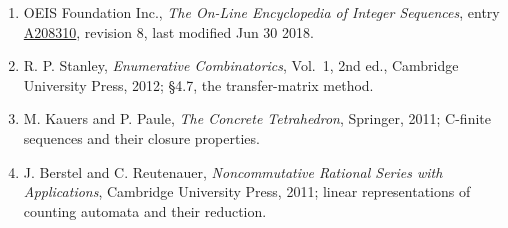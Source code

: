 \documentclass[11pt]{article}
\theoremstyle{definition}
\begin{document}
\begin{enumerate}

\item OEIS Foundation Inc., \emph{The On-Line Encyclopedia of Integer Sequences}, entry \href{https://oeis.org/A208310}{A208310}, revision 8, last modified Jun 30 2018.

\item R. P. Stanley, \emph{Enumerative Combinatorics}, Vol.~1, 2nd ed., Cambridge University Press, 2012; \S4.7, the transfer-matrix method.

\item M. Kauers and P. Paule, \emph{The Concrete Tetrahedron}, Springer, 2011; C-finite sequences and their closure properties.

\item J. Berstel and C. Reutenauer, \emph{Noncommutative Rational Series with Applications}, Cambridge University Press, 2011; linear representations of counting automata and their reduction.

\end{enumerate}
\end{document}
